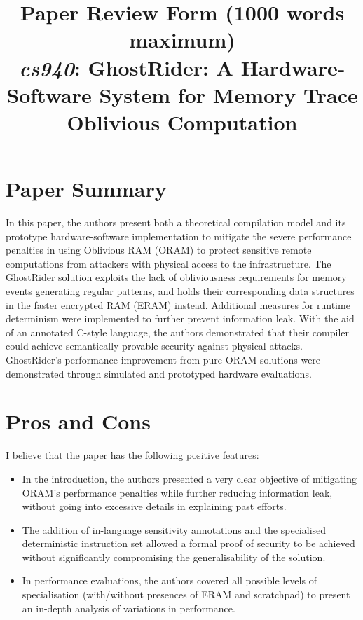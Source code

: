 \documentclass[11pt]{article}
\begin{document}
\title{Paper Review Form (1000 words maximum)\\
  \emph{cs940}: GhostRider: A Hardware-Software System for Memory Trace Oblivious Computation \cite{liu2015ghostrider}}
\maketitle

\section*{Paper Summary}

In this paper, the authors present both a theoretical compilation model and its prototype hardware-software implementation to mitigate the severe performance penalties in using Oblivious RAM (ORAM) to protect sensitive remote computations from attackers with physical access to the infrastructure. The GhostRider solution exploits the lack of obliviousness requirements for memory events generating regular patterns, and holds their corresponding data structures in the faster encrypted RAM (ERAM) instead. Additional measures for runtime determinism were implemented to further prevent information leak. With the aid of an annotated C-style language, the authors demonstrated that their compiler could achieve semantically-provable security against physical attacks. GhostRider's performance improvement from pure-ORAM solutions were demonstrated through simulated and prototyped hardware evaluations.

\section*{Pros and Cons}

I believe that the paper has the following positive features:
\begin{itemize}
	\item In the introduction, the authors presented a very clear objective of mitigating ORAM's performance penalties while further reducing information leak, without going into excessive details in explaining past efforts.
	\item The addition of in-language sensitivity annotations and the specialised deterministic instruction set allowed a formal proof of security to be achieved without significantly compromising the generalisability of the solution.
	\item In performance evaluations, the authors covered all possible levels of specialisation (with/without presences of ERAM and scratchpad) to present an in-depth analysis of variations in performance.
\end{itemize}
\end{document}
